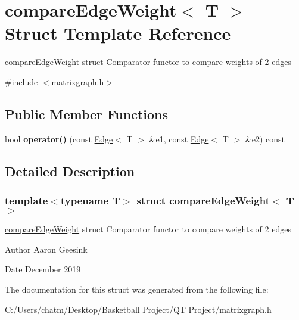 \hypertarget{structcompare_edge_weight}{}\section{compare\+Edge\+Weight$<$ T $>$ Struct Template Reference}
\label{structcompare_edge_weight}


\mbox{\hyperlink{structcompare_edge_weight}{compare\+Edge\+Weight}} struct Comparator functor to compare weights of 2 edges  




{\ttfamily \#include $<$matrixgraph.\+h$>$}

\subsection*{Public Member Functions}
\begin{DoxyCompactItemize}
\item 
\mbox{\label{structcompare_edge_weight_a2ea774e59a61b55ce4b43b7735d474b6}} 
bool {\bfseries operator()} (const \mbox{\hyperlink{struct_edge}{Edge}}$<$ T $>$ \&e1, const \mbox{\hyperlink{struct_edge}{Edge}}$<$ T $>$ \&e2) const
\end{DoxyCompactItemize}


\subsection{Detailed Description}
\subsubsection*{template$<$typename T$>$\newline
struct compare\+Edge\+Weight$<$ T $>$}

\mbox{\hyperlink{structcompare_edge_weight}{compare\+Edge\+Weight}} struct Comparator functor to compare weights of 2 edges 

\begin{DoxyAuthor}{Author}
Aaron Geesink 
\end{DoxyAuthor}
\begin{DoxyDate}{Date}
December 2019 
\end{DoxyDate}


The documentation for this struct was generated from the following file\+:\begin{DoxyCompactItemize}
\item 
C\+:/\+Users/chatm/\+Desktop/\+Basketball Project/\+Q\+T Project/matrixgraph.\+h\end{DoxyCompactItemize}
